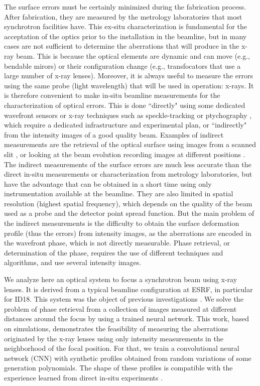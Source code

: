 \documentclass{iucr}
\begin{document}
The surface errors must be certainly minimized during the fabrication process. After fabrication, they are measured by the metrology laboratories that most synchrotron facilities have. This ex-situ characterization is fundamental for the acceptation of the optics prior to the installation in the beamline, but in many cases are not sufficient to determine the aberrations that will produce in the x-ray beam. This is because the optical elements are dynamic and can move (e.g., bendable mirors) or their configuration change (e.g., transfocators that use a large number of x-ray lenses). Moreover, it is always useful to measure the errors using the same probe (light wavelength) that will be used in operation: x-rays. It is therefore convenient to make in-situ beamline measurements for the characterization of optical errors. This is done ``directly" using some dedicated wavefront sensors or x-ray techniques such as speckle-tracking \cite{berujon_theory_2020, berujon_experiments_2020} or ptychography \cite{Pfeiffer2018-au}, which require a dedicated infrastructure and experimental plan, or ``indirectly" from the intensity images of a good quality beam. Examples of indirect measurements are the retrieval of the optical surface using images from a scanned slit \cite{Zhang:ve5019}, or looking at the beam evolution recording images at different positions \cite{Celestre:yi5119}. The indirect measurements of the surface errors are much less accurate than the direct in-situ measurements or characterization from metrology laboratories, but have the advantage that can be obtained in a short time using only instrumentation available at the beamline. They are also limited in spatial resolution (highest spatial frequency), which depends on the quality of the beam used as a probe and the detector point spread function. But the main problem of the indirect measurements is the difficulty to obtain the surface deformation profile (thus the errors) from intensity images, as the aberrations are encoded in the wavefront phase, which is not directly measurable. Phase retrieval, or determination of the phase, requires the use of different techniques and algorithms, and use several intensity images.

We analyze here an optical system to focus a synchrotron beam using x-ray lenses. It is derived from a typical beamline configuration at ESRF, in particular for ID18. This system was the object of previous investigations \cite{SanchezdelRio:ay5600}. We solve the problem of phase retrieval from a collection of images measured at different distances around the focus by using a trained neural network. This work, based on simulations, demonstrates the feasibility of measuring the aberrations originated by the x-ray lenses using only intensity measurements in the neighborhood of the focal position. For that, we train a convolutional neural network (CNN) with synthetic profiles obtained from random variations of some generation polynomials. The shape of these profiles is compatible with the experience learned from direct in-situ experiments \cite{Celestre:yi5119}. 
\end{document}
